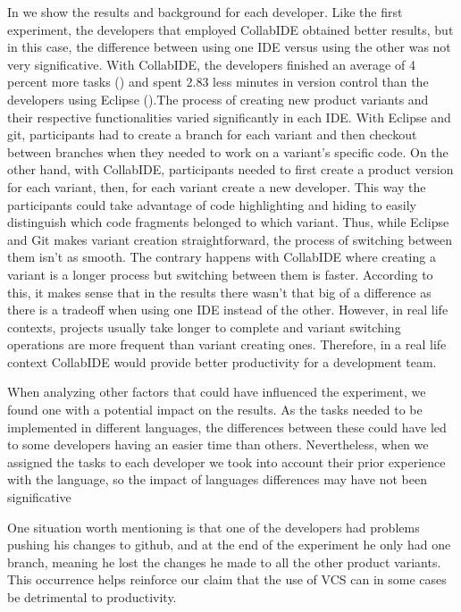 In  we show the results and background for each developer. Like the first experiment, the developers that employed CollabIDE obtained better results, but in this case, the difference between using one IDE versus using the other was not very significative. With CollabIDE, the developers finished an average of 4 percent more tasks () and spent 2.83 less minutes in version control than the developers using Eclipse ().The process of creating new product variants and their respective functionalities varied significantly in each IDE. With Eclipse and git, participants had to create a branch for each variant and then checkout between branches when they needed to work on a variant’s specific code. On the other hand, with CollabIDE, participants needed to first create a product version for each variant, then, for each variant create a new developer. This way the participants could take advantage of code highlighting and hiding to easily distinguish which code fragments belonged to which variant. Thus, while Eclipse and Git makes variant creation straightforward, the process of switching between them isn’t as smooth. The contrary happens with CollabIDE where creating a variant is a longer process but switching between them is faster. According to this, it makes sense that in the results there wasn’t that big of a difference as there is a tradeoff when using one IDE instead of the other. However, in real life contexts, projects usually take longer to complete and variant switching operations are more frequent than variant creating ones. Therefore, in a real life context CollabIDE would provide better productivity for a development team.

When analyzing other factors that could have influenced the experiment, we found one with a potential impact on the results. As the tasks needed to be implemented in different languages, the differences between these could have led to some developers having an easier time than others. Nevertheless, when we assigned the tasks to each developer we took into account their prior experience with the language, so the impact of languages differences may have not been significative

One situation worth mentioning is that one of the developers had problems pushing his changes to github, and at the end of the experiment he only had one branch, meaning he lost the changes he made to all the other product variants. This occurrence helps reinforce our claim that the use of \ac{VCS} can in some cases be detrimental to productivity.

